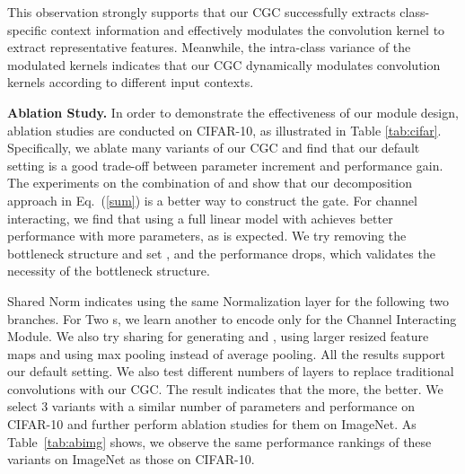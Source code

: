 \documentclass[runningheads]{llncs}
\begin{document}
This observation strongly supports that our CGC successfully extracts class-specific context information and effectively modulates the convolution kernel to extract representative features. Meanwhile, the intra-class variance of the modulated kernels indicates that our CGC dynamically modulates convolution kernels according to different input contexts.

\textbf{Ablation Study.} 
In order to demonstrate the effectiveness of our module design, ablation studies are conducted on CIFAR-10, as illustrated in Table \ref{tab:cifar}. Specifically, we ablate many variants of our CGC and find that our default setting is a good trade-off between parameter increment and performance gain. The experiments on the combination of  and  show that our decomposition approach in Eq.~(\ref{sum}) is a better way to construct the gate. For channel interacting, we find that using a full linear model with  achieves better performance with more parameters, as is expected. We try removing the bottleneck structure and set , and the performance drops, which validates the necessity of the bottleneck structure.

Shared Norm indicates using the same Normalization layer for the following two branches. For Two s, we learn another  to encode  only for the Channel Interacting Module.  We also try sharing  for generating  and , using larger resized feature maps and using max pooling instead of average pooling. All the results support our default setting. We also test different numbers of layers to replace traditional convolutions with our CGC. The result indicates that the more, the better. We select 3 variants with a similar number of parameters and performance on CIFAR-10 and further perform ablation studies for them on ImageNet. As Table~\ref{tab:abimg} shows, we observe the same performance rankings of these variants on ImageNet as those on CIFAR-10.
\end{document}
